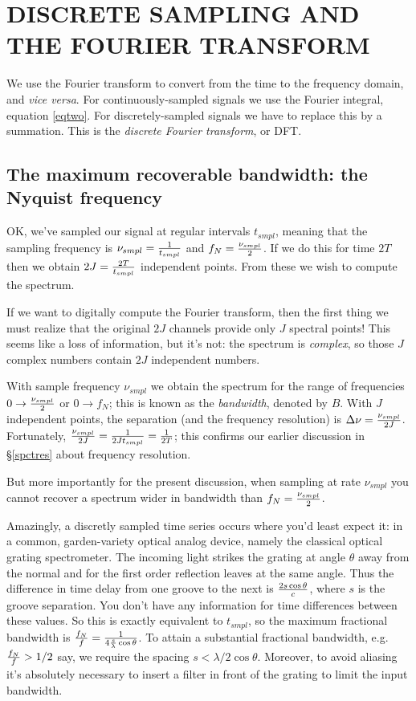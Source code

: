 \documentclass[psfig,preprint]{aastex}
\begin{document}
\section{DISCRETE SAMPLING AND THE FOURIER TRANSFORM}

          We use the Fourier transform to convert from the time to the
frequency domain, and {\it vice versa}.  For continuously-sampled
signals we use the Fourier integral, equation \ref{eqtwo}. For
discretely-sampled signals we have to replace this by a summation.  This
is the {\it discrete Fourier transform}, or DFT. 

\subsection {The maximum recoverable bandwidth: the Nyquist frequency}

         OK, we've sampled our signal at regular intervals $t_{smpl}$,
meaning that the sampling frequency is $\nu_{smpl} = {1 \over t_{smpl}}$
and $f_N = {\nu_{smpl} \over 2}$. If we do this for time $2T$ then we
obtain $2J = {2T \over t_{smpl}}$ independent points. From these we wish
to compute the spectrum.

	If we want to digitally compute the Fourier transform, then the
first thing we  must realize that the original $2J$ channels provide
only $J$ spectral points! This seems like a loss of information, but
it's not: the spectrum is {\it complex}, so those $J$ complex numbers
contain $2J$ independent numbers. 

	With sample frequency $\nu_{smpl}$ we obtain the spectrum for
the range of frequencies $0 \rightarrow {\nu_{smpl} \over 2}$ or $0
\rightarrow f_N$; this is known as the {\it bandwidth}, denoted by $B$.
With $J$ independent points, the separation (and the frequency
resolution) is $\Delta \nu = {\nu_{smpl} \over 2J}$. Fortunately,
${\nu_{smpl} \over 2J} = {1 \over 2 J t_{smpl}} = {1 \over 2T}$; this
confirms our earlier discussion in \S \ref{spctres} about frequency
resolution. 

	But more importantly for the present discussion, when sampling
at rate $\nu_{smpl}$ you cannot recover a spectrum wider in bandwidth
than $f_N = {\nu_{smpl} \over 2}$. 

	Amazingly, a discretly sampled time series occurs where you'd
least expect it: in a common, garden-variety optical analog device,
namely the classical optical grating spectrometer. The incoming light
strikes the grating at angle $\theta$ away from the normal and for the
first order reflection leaves at the same angle. Thus the difference in
time delay from one groove to the next is ${2s \cos \theta \over c}$,
where $s$ is the groove separation. You don't have any information for
time differences between these values. So this is exactly equivalent to
$t_{smpl}$, so the maximum fractional bandwidth is ${f_N \over f} = {1
\over 4 {s \over \lambda} \cos \theta}$. To attain a substantial
fractional bandwidth, e.g.\ ${f_N \over f} > {1/2}$ say, we require the
spacing $s < {\lambda /2 \cos \theta}$. Moreover, to avoid aliasing it's
absolutely necessary to insert a filter in front of the grating to limit
the input bandwidth. 
\end{document}
